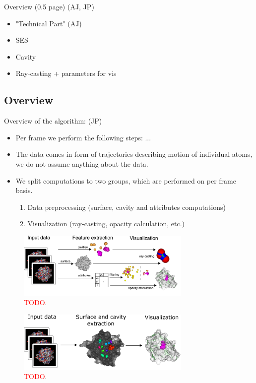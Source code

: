 Overview (0.5 page) (AJ, JP)
\begin{itemize}
  \item "Technical Part" (AJ)
  \item SES
  \item Cavity
  \item Ray-casting + parameters for vis
\end{itemize}

\subsection{Overview}

Overview of the algorithm: (JP)
\begin{itemize}
  \item Per frame we perform the following steps: ...
  \item The data comes in form of trajectories describing motion of individual atoms, we do not assume anything about the data.
  \item We split computations to two groups, which are performed on per frame basis.
	\begin{enumerate}
	  \item Data preprocessing (surface, cavity and attributes computations)
		\item Visualization  (ray-casting, opacity calculation, etc.)
	\end{enumerate}
\end{itemize}

\begin{figure}[htb]
  \centering
  \includegraphics[width=3.3in]{image/overview.png}
  \caption{\textcolor{red}{TODO}.}
	\label{fig:overview}
\end{figure}

\begin{figure}[htb]
  \centering
  \includegraphics[width=3.3in]{image/overview2.png}
  \caption{\textcolor{red}{TODO}.}
	\label{fig:overview2}
\end{figure}

